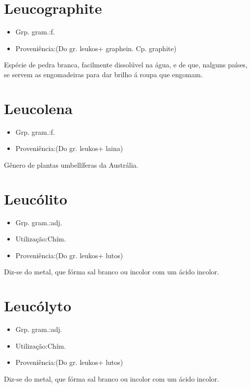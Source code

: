 \section{Leucographite}
\begin{itemize}
\item {Grp. gram.:f.}
\end{itemize}
\begin{itemize}
\item {Proveniência:(Do gr. \textunderscore leukos\textunderscore  + \textunderscore graphein\textunderscore . Cp. \textunderscore graphite\textunderscore )}
\end{itemize}
Espécie de pedra branca, facilmente dissolúvel na água, e de que, nalguns países, se servem as engomadeiras para dar brilho á roupa que engomam.
\section{Leucolena}
\begin{itemize}
\item {Grp. gram.:f.}
\end{itemize}
\begin{itemize}
\item {Proveniência:(Do gr. \textunderscore leukos\textunderscore  + \textunderscore laina\textunderscore )}
\end{itemize}
Gênero de plantas umbellíferas da Austrália.
\section{Leucólito}
\begin{itemize}
\item {Grp. gram.:adj.}
\end{itemize}
\begin{itemize}
\item {Utilização:Chím.}
\end{itemize}
\begin{itemize}
\item {Proveniência:(Do gr. \textunderscore leukos\textunderscore  + \textunderscore lutos\textunderscore )}
\end{itemize}
Diz-se do metal, que fórma sal branco ou incolor com um ácido incolor.
\section{Leucólyto}
\begin{itemize}
\item {Grp. gram.:adj.}
\end{itemize}
\begin{itemize}
\item {Utilização:Chím.}
\end{itemize}
\begin{itemize}
\item {Proveniência:(Do gr. \textunderscore leukos\textunderscore  + \textunderscore lutos\textunderscore )}
\end{itemize}
Diz-se do metal, que fórma sal branco ou incolor com um ácido incolor.
